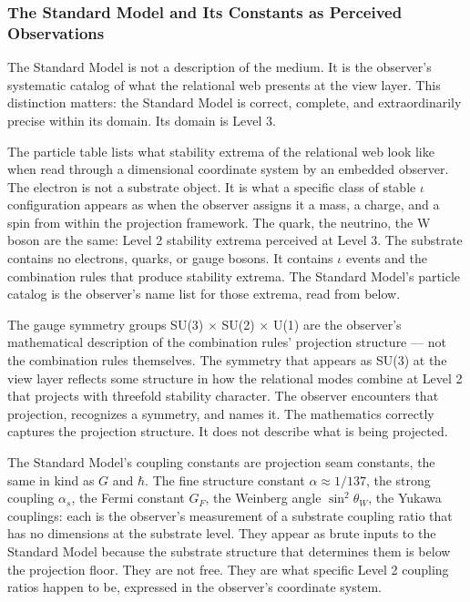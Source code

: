 \documentclass[11pt,letterpaper]{article}
\begin{document}
\subsubsection{The Standard Model and Its Constants as Perceived Observations}
\label{sec:org4dbb17d}

The Standard Model is not a description of the medium. It is the observer's systematic catalog of what the relational web presents at the view layer. This distinction matters: the Standard Model is correct, complete, and extraordinarily precise within its domain. Its domain is Level 3.

The particle table lists what stability extrema of the relational web look like when read through a dimensional coordinate system by an embedded observer. The electron is not a substrate object. It is what a specific class of stable \(\iota\) configuration appears as when the observer assigns it a mass, a charge, and a spin from within the projection framework. The quark, the neutrino, the W boson are the same: Level 2 stability extrema perceived at Level 3. The substrate contains no electrons, quarks, or gauge bosons. It contains \(\iota\) events and the combination rules that produce stability extrema. The Standard Model's particle catalog is the observer's name list for those extrema, read from below.

The gauge symmetry groups SU(3) \(\times\) SU(2) \(\times\) U(1) are the observer's mathematical description of the combination rules' projection structure --- not the combination rules themselves. The symmetry that appears as SU(3) at the view layer reflects some structure in how the relational modes combine at Level 2 that projects with threefold stability character. The observer encounters that projection, recognizes a symmetry, and names it. The mathematics correctly captures the projection structure. It does not describe what is being projected.

The Standard Model's coupling constants are projection seam constants, the same in kind as \(G\) and \(\hbar\). The fine structure constant \(\alpha \approx 1/137\), the strong coupling \(\alpha_s\), the Fermi constant \(G_F\), the Weinberg angle \(\sin^2\theta_W\), the Yukawa couplings: each is the observer's measurement of a substrate coupling ratio that has no dimensions at the substrate level. They appear as brute inputs to the Standard Model because the substrate structure that determines them is below the projection floor. They are not free. They are what specific Level 2 coupling ratios happen to be, expressed in the observer's coordinate system.
\end{document}
